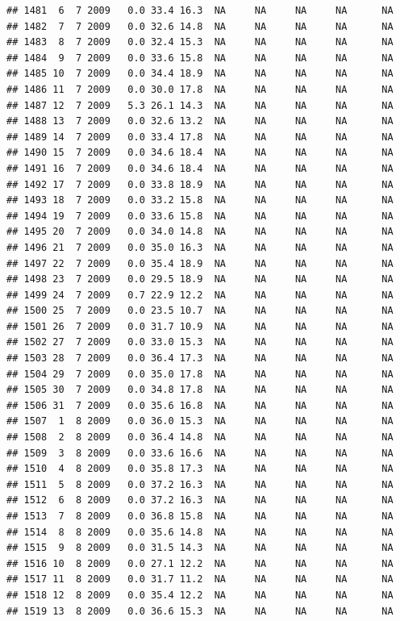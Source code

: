\documentclass[
]{book}
\begin{document}
\begin{verbatim}
## 1481  6  7 2009   0.0 33.4 16.3  NA     NA     NA     NA      NA
## 1482  7  7 2009   0.0 32.6 14.8  NA     NA     NA     NA      NA
## 1483  8  7 2009   0.0 32.4 15.3  NA     NA     NA     NA      NA
## 1484  9  7 2009   0.0 33.6 15.8  NA     NA     NA     NA      NA
## 1485 10  7 2009   0.0 34.4 18.9  NA     NA     NA     NA      NA
## 1486 11  7 2009   0.0 30.0 17.8  NA     NA     NA     NA      NA
## 1487 12  7 2009   5.3 26.1 14.3  NA     NA     NA     NA      NA
## 1488 13  7 2009   0.0 32.6 13.2  NA     NA     NA     NA      NA
## 1489 14  7 2009   0.0 33.4 17.8  NA     NA     NA     NA      NA
## 1490 15  7 2009   0.0 34.6 18.4  NA     NA     NA     NA      NA
## 1491 16  7 2009   0.0 34.6 18.4  NA     NA     NA     NA      NA
## 1492 17  7 2009   0.0 33.8 18.9  NA     NA     NA     NA      NA
## 1493 18  7 2009   0.0 33.2 15.8  NA     NA     NA     NA      NA
## 1494 19  7 2009   0.0 33.6 15.8  NA     NA     NA     NA      NA
## 1495 20  7 2009   0.0 34.0 14.8  NA     NA     NA     NA      NA
## 1496 21  7 2009   0.0 35.0 16.3  NA     NA     NA     NA      NA
## 1497 22  7 2009   0.0 35.4 18.9  NA     NA     NA     NA      NA
## 1498 23  7 2009   0.0 29.5 18.9  NA     NA     NA     NA      NA
## 1499 24  7 2009   0.7 22.9 12.2  NA     NA     NA     NA      NA
## 1500 25  7 2009   0.0 23.5 10.7  NA     NA     NA     NA      NA
## 1501 26  7 2009   0.0 31.7 10.9  NA     NA     NA     NA      NA
## 1502 27  7 2009   0.0 33.0 15.3  NA     NA     NA     NA      NA
## 1503 28  7 2009   0.0 36.4 17.3  NA     NA     NA     NA      NA
## 1504 29  7 2009   0.0 35.0 17.8  NA     NA     NA     NA      NA
## 1505 30  7 2009   0.0 34.8 17.8  NA     NA     NA     NA      NA
## 1506 31  7 2009   0.0 35.6 16.8  NA     NA     NA     NA      NA
## 1507  1  8 2009   0.0 36.0 15.3  NA     NA     NA     NA      NA
## 1508  2  8 2009   0.0 36.4 14.8  NA     NA     NA     NA      NA
## 1509  3  8 2009   0.0 33.6 16.6  NA     NA     NA     NA      NA
## 1510  4  8 2009   0.0 35.8 17.3  NA     NA     NA     NA      NA
## 1511  5  8 2009   0.0 37.2 16.3  NA     NA     NA     NA      NA
## 1512  6  8 2009   0.0 37.2 16.3  NA     NA     NA     NA      NA
## 1513  7  8 2009   0.0 36.8 15.8  NA     NA     NA     NA      NA
## 1514  8  8 2009   0.0 35.6 14.8  NA     NA     NA     NA      NA
## 1515  9  8 2009   0.0 31.5 14.3  NA     NA     NA     NA      NA
## 1516 10  8 2009   0.0 27.1 12.2  NA     NA     NA     NA      NA
## 1517 11  8 2009   0.0 31.7 11.2  NA     NA     NA     NA      NA
## 1518 12  8 2009   0.0 35.4 12.2  NA     NA     NA     NA      NA
## 1519 13  8 2009   0.0 36.6 15.3  NA     NA     NA     NA      NA

\end{verbatim}
\end{document}
